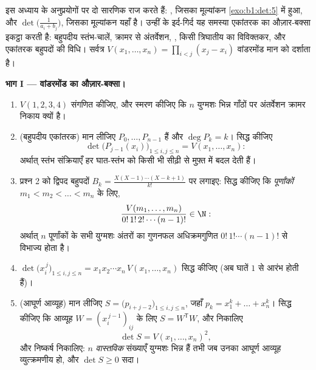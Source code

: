 \begin{problem}\label{pb:b1:det:1}
इस अध्याय के अनुप्रयोगों पर दो सारणिक राज करते हैं: , जिसका
मूल्यांकन \cref{exo:b1:det:5} में हुआ, और \emph{}
$\det\bigl(\frac{1}{a_i + b_j}\bigr)$, जिसका मूल्यांकन यहाँ है। उन्हीं के
इर्द-गिर्द यह समस्या एकांतरक का औज़ार-बक्सा इकट्ठा करती है: बहुपदीय
स्तंभ-चालें, क्रामर से अंतर्वेशन, , किसी त्रिघातीय का
विविक्तकर, और एकांतरक बहुपदों की विधि। सर्वत्र $V(x_1, \dots, x_n) =
\prod_{i < j}(x_j - x_i)$ वांडरमोंड मान को दर्शाता है। 

\medskip \noindent\textbf{भाग I --- वांडरमोंड का औज़ार-बक्सा।}
\begin{enumerate}
  \item $V(1, 2, 3, 4)$ संगणित कीजिए, और स्मरण कीजिए कि $n$ युग्मशः भिन्न
  गाँठों पर अंतर्वेशन क्रामर निकाय क्यों है।
  \item (बहुपदीय एकांतरक) मान लीजिए $P_0, \dots, P_{n-1}$ \emph{}
  हैं और $\deg P_k = k$। सिद्ध कीजिए
        \[
        \det\bigl(P_{j-1}(x_i)\bigr)_{1 \leq i, j \leq n}
        = V(x_1, \dots, x_n) :
        \]
        अर्थात् स्तंभ संक्रियाएँ हर घात-स्तंभ को किसी भी  सीढ़ी से
        मुफ़्त में बदल देती हैं।
  \item प्रश्न 2 को द्विपद बहुपदों $B_k = \frac{X(X-1)\cdots(X-k+1)}{k!}$ पर
  लगाइए: सिद्ध कीजिए कि \emph{पूर्णांकों} $m_1 < m_2 < \dots < m_n$ के लिए,
        \[
        \frac{V(m_1, \dots, m_n)}{0!\,1!\,2!\cdots(n-1)!}
        \in \N :
        \]
        अर्थात् $n$ पूर्णांकों के सभी युग्मशः अंतरों का गुणनफल अधिक्रमगुणित
        $0!\,1!\cdots(n-1)!$ से विभाज्य होता है।
  \item $\det\bigl(x_i^{\,j}\bigr)_{1 \leq i, j \leq n} = x_1 x_2 \cdots
  x_n\, V(x_1, \dots, x_n)$ सिद्ध कीजिए (अब घातें $1$ से आरंभ होती हैं)।
  \item (आघूर्ण आव्यूह) मान लीजिए $S = \bigl(p_{i+j-2}\bigr)_{1 \leq i, j
  \leq n}$, जहाँ $p_k = x_1^k + \dots + x_n^k$। सिद्ध कीजिए कि आव्यूह $W =
  (x_i^{\,j-1})_{ij}$ के लिए $S = W^{\mathsf T} W$, और निकालिए
        \[
        \det S = V(x_1, \dots, x_n)^2 ,
        \]
        और निष्कर्ष निकालिए: $n$ \emph{वास्तविक} संख्याएँ युग्मशः भिन्न हैं
        तभी जब उनका आघूर्ण आव्यूह व्युत्क्रमणीय हो, और $\det S \geq 0$ सदा।
\end{enumerate}


\end{problem}
